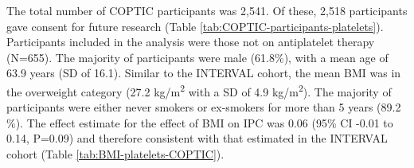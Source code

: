 \documentclass[11pt,twoside]{bristolthesis}
\begin{document}
The total number of COPTIC participants was 2,541. Of these, 2,518 participants gave consent for future research (Table \ref{tab:COPTIC-participants-platelets}). Participants included in the analysis were those not on antiplatelet therapy (N=655). The majority of participants were male (61.8\%), with a mean age of 63.9 years (SD of 16.1). Similar to the INTERVAL cohort, the mean BMI was in the overweight category (27.2 kg/m\textsuperscript{2} with a SD of 4.9 kg/m\textsuperscript{2}). The majority of participants were either never smokers or ex-smokers for more than 5 years (89.2 \%). The effect estimate for the effect of BMI on IPC was 0.06 (95\% CI -0.01 to 0.14, P=0.09) and therefore consistent with that estimated in the INTERVAL cohort (Table \ref{tab:BMI-platelets-COPTIC}).
\begin{table}


\end{table}
\end{document}
